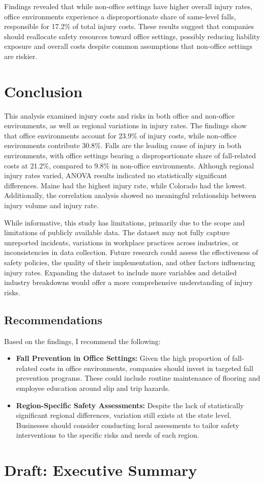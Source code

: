 \documentclass[
  letterpaper,
  DIV=11,
  numbers=noendperiod]{scrreprt}
\begin{document}
Findings revealed that while non-office settings have higher overall
injury rates, office environments experience a disproportionate share of
same-level falls, responsible for 17.2\% of total injury costs. These
results suggest that companies should reallocate safety resources toward
office settings, possibly reducing liability exposure and overall costs
despite common assumptions that non-office settings are riskier.

\chapter{Conclusion}\label{conclusion}

This analysis examined injury costs and risks in both office and
non-office environments, as well as regional variations in injury rates.
The findings show that office environments account for 23.9\% of injury
costs, while non-office environments contribute 30.8\%. Falls are the
leading cause of injury in both environments, with office settings
bearing a disproportionate share of fall-related costs at 21.2\%,
compared to 9.8\% in non-office environments. Although regional injury
rates varied, ANOVA results indicated no statistically significant
differences. Maine had the highest injury rate, while Colorado had the
lowest. Additionally, the correlation analysis showed no meaningful
relationship between injury volume and injury rate.

While informative, this study has limitations, primarily due to the
scope and limitations of publicly available data. The dataset may not
fully capture unreported incidents, variations in workplace practices
across industries, or inconsistencies in data collection. Future
research could assess the effectiveness of safety policies, the quality
of their implementation, and other factors influencing injury rates.
Expanding the dataset to include more variables and detailed industry
breakdowns would offer a more comprehensive understanding of injury
risks.

\section{Recommendations}\label{recommendations}

Based on the findings, I recommend the following:

\begin{itemize}
\item
  \textbf{Fall Prevention in Office Settings:} Given the high proportion
  of fall-related costs in office environments, companies should invest
  in targeted fall prevention programs. These could include routine
  maintenance of flooring and employee education around slip and trip
  hazards.
\item
  \textbf{Region-Specific Safety Assessments:} Despite the lack of
  statistically significant regional differences, variation still exists
  at the state level. Businesses should consider conducting local
  assessments to tailor safety interventions to the specific risks and
  needs of each region.
\end{itemize}

\chapter{Draft: Executive Summary}\label{draft-executive-summary}
\end{document}
